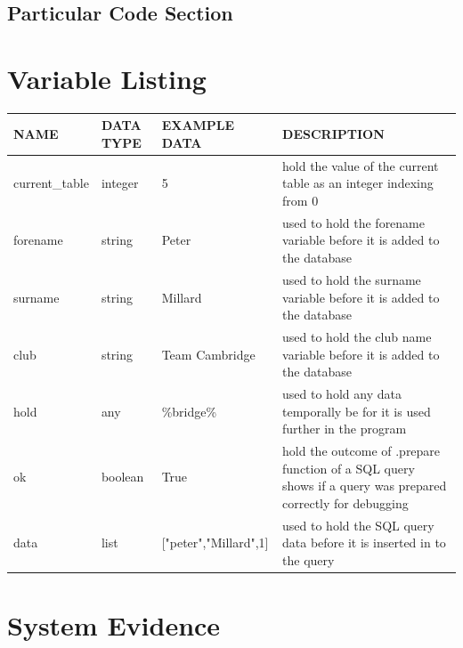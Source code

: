 \subsection{Particular Code Section}

\section{Variable Listing}

\begin{tabular}{|l|l|l|p{4cm}|}
	\hline
	NAME           & DATA TYPE & EXAMPLE DATA & DESCRIPTION                                                       \\ \hline
	current\_table & integer   & 5            & hold the value of the current table as an integer indexing from 0 \\ \hline
	forename & string & Peter & used to hold the forename variable before it is added to the database \\\hline
	surname & string & Millard & used to hold the surname variable before it is added to the database\\\hline
	club &  string & Team Cambridge & used to hold the club name variable before it is added to the database\\\hline
	hold & any & \%bridge\% & used to hold any data temporally be for it is used further in the program \\\hline
	ok & boolean & True & hold the outcome of .prepare function of a SQL query shows if a query was prepared correctly for debugging \\\hline
	data & list & ["peter","Millard",1] & used to hold the SQL query data before it is inserted in to the query \\\hline
	
\end{tabular}

\section{System Evidence}

